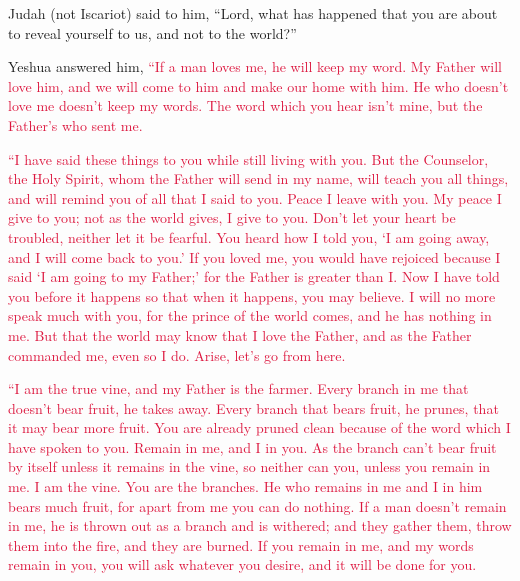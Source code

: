 \myverse{}Judah (not Iscariot) said to him, “Lord, what has happened that
you are about to reveal yourself to us, and not to the world?”

\myverse{}Yeshua answered him,
\textcolor{crimson}{“If a man loves me, he will keep my word. My Father will love him, and we will come to him and make
	our home with him.
}
\myverse{}\textcolor{crimson}{He who doesn’t love me doesn’t keep my words. The word which you hear
	isn’t mine, but the Father’s who sent me.
}

\myverse{}\textcolor{crimson}{“I have said these things to you while still living with
	you.
}
\myverse{}\textcolor{crimson}{But the Counselor, the Holy Spirit, whom the Father will send in my name,
	will teach you all things, and will remind you of all that I said to you.
}
\myverse{}\textcolor{crimson}{Peace I leave with you. My peace I give to you; not as the world gives,
	I give to you. Don’t let your heart be troubled, neither let it be fearful.
}
\myverse{}\textcolor{crimson}{You heard how I told you, ‘I am going away, and I will come back to you.’
	If you loved me, you would have rejoiced because I said ‘I am going to my Father;’ for the Father is greater
	than I.
}
\myverse{}\textcolor{crimson}{Now I have told you before it happens so that when it happens, you may
	believe.
}
\myverse{}\textcolor{crimson}{I will no more speak much with you, for the prince of the world comes,
	and he has nothing in me.
}
\myverse{}\textcolor{crimson}{But that the world may know that I love the Father, and as the Father
	commanded me, even so I do. Arise, let’s go from here.}


\mychapter{} \myverse*{}\textcolor{crimson}{“I am the true vine, and my Father is the farmer.
}
\myverse{}\textcolor{crimson}{Every branch in me that doesn’t bear fruit, he takes away. Every branch
	that bears fruit, he prunes, that it may bear more fruit.
}
\myverse{}\textcolor{crimson}{You are already pruned clean because of the word which I have spoken to
	you.
}
\myverse{}\textcolor{crimson}{Remain in me, and I in you. As the branch can’t bear fruit by itself unless
	it remains in the vine, so neither can you, unless you remain in me.
}
\myverse{}\textcolor{crimson}{I am the vine. You are the branches. He who remains in me and I in him
	bears much fruit, for apart from me you can do nothing.
}
\myverse{}\textcolor{crimson}{If a man doesn’t remain in me, he is thrown out as a branch and is withered;
	and they gather them, throw them into the fire, and they are burned.
}
\myverse{}\textcolor{crimson}{If you remain in me, and my words remain in you, you will ask whatever
	you desire, and it will be done for you.}

